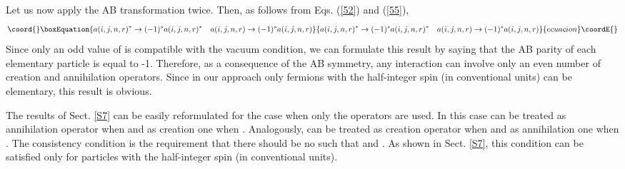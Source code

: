 \documentclass[a4paper,12pt]{article}%
\begin{document}
Let us now apply the AB transformation twice. Then, as follows 
from Eqs. (\ref{52}) and (\ref{55}), 
\begin{equation}\coord{}\boxEquation{
a(i,j,n,r)^*\rightarrow (-1)^sa(i,j,n,r)^*\quad
a(i,j,n,r)\rightarrow (-1)^sa(i,j,n,r)
\label{63}
}{
a(i,j,n,r)^*\rightarrow (-1)^sa(i,j,n,r)^*\quad
a(i,j,n,r)\rightarrow (-1)^sa(i,j,n,r)
}{ecuacion}\coordE{}\end{equation} 
Since only an odd value of \coordHE{} is compatible with
the vacuum condition, we can formulate this result
by saying that the AB\coordHE{} parity of each elementary
particle is equal to -1. Therefore, as a consequence
of the AB symmetry, any interaction can involve 
only an even number of creation and annihilation 
operators. Since in our approach only fermions 
with the half-integer spin (in conventional units)
can be elementary, this result is obvious.

The results of Sect. \ref{S7} can be easily
reformulated for the case when only the \coordHE{}
operators are used. In this case \coordHE{} can
be treated as annihilation operator when 
\coordHE{} and as creation one when
\coordHE{}. Analogously, \coordHE{} can
be treated as creation operator when 
\coordHE{} and as annihilation one when
\coordHE{}. The consistency condition is
the requirement that there should be no such 
\coordHE{} that \coordHE{} and
\coordHE{}. As shown in Sect. \ref{S7},
this condition can be satisfied only for particles
with the half-integer spin (in conventional units).
\end{document}
